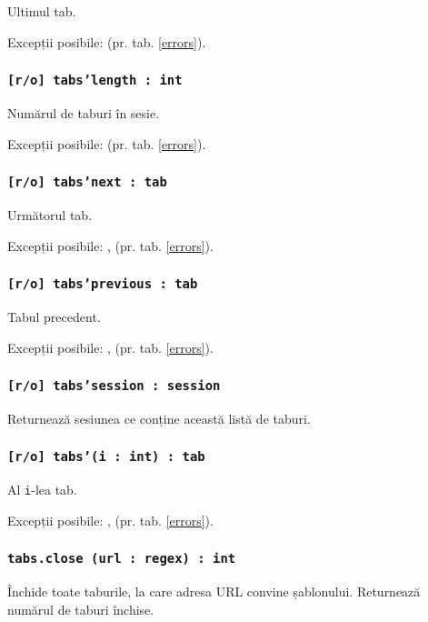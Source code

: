 Ultimul tab.

Excepții posibile:  (pr. tab. \ref{errors}).

\subsubsection{\texttt{[r/o] tabs'length : int}}

Numărul de taburi în sesie.

Excepții posibile:  (pr. tab. \ref{errors}).

\subsubsection{\texttt{[r/o] tabs'next : tab}}

Următorul tab.

Excepții posibile: ,  (pr. tab. \ref{errors}).

\subsubsection{\texttt{[r/o] tabs'previous : tab}}

Tabul precedent.

Excepții posibile: ,  (pr. tab. \ref{errors}).

\subsubsection{\texttt{[r/o] tabs'session : session}}

Returnează sesiunea ce conține această listă de taburi.

\subsubsection{\texttt{[r/o] tabs'(i : int) : tab}}

Al \texttt{i}-lea tab.

Excepții posibile: ,  (pr. tab. \ref{errors}).

\subsubsection{\texttt{tabs.close (url : regex) : int}}

Închide toate taburile, la care adresa URL convine șablonului. Returnează numărul de taburi închise.

